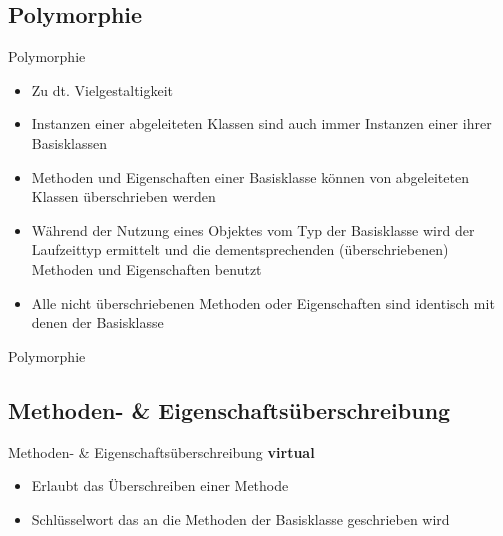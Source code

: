\subsection{Polymorphie}
\begin{frame}{Polymorphie}
	\begin{itemize}
		\item Zu dt. Vielgestaltigkeit
		\item Instanzen einer abgeleiteten Klassen sind auch immer Instanzen einer ihrer Basisklassen
		\item Methoden und Eigenschaften einer Basisklasse können von abgeleiteten Klassen überschrieben werden
		\item Während der Nutzung eines Objektes vom Typ der Basisklasse wird der Laufzeittyp ermittelt und die dementsprechenden (überschriebenen) Methoden und Eigenschaften benutzt
		\item Alle nicht überschriebenen Methoden oder Eigenschaften sind identisch mit denen der Basisklasse
	\end{itemize} 
\end{frame}

\begin{frame}{Polymorphie}
	
	
\end{frame}


\subsection{Methoden- \& Eigenschaftsüberschreibung}
\begin{frame}{Methoden- \& Eigenschaftsüberschreibung}	
	\textbf{virtual}
	\begin{itemize}
		\item Erlaubt das Überschreiben einer Methode
		\item Schlüsselwort das an die Methoden der Basisklasse geschrieben wird
	\end{itemize}
	
\end{frame}

